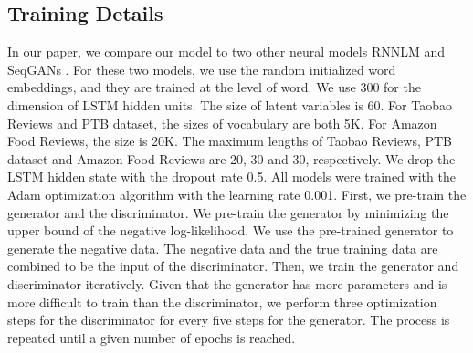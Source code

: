 \documentclass{llncs}
\begin{document}
\subsection{Training Details}
In our paper, we compare our model to two other neural models RNNLM \cite{mikolov2010recurrent} and SeqGANs \cite{yu2016seqgan:}. For these two models, we use the random initialized word embeddings, and they are trained at the level of word. We use 300 for the dimension of LSTM hidden units. The size of latent variables is 60. For Taobao Reviews and PTB dataset, the sizes of vocabulary are both 5K. For Amazon Food Reviews, the size is 20K. The maximum lengths of Taobao Reviews, PTB dataset and Amazon Food Reviews are 20, 30 and 30, respectively. We drop the LSTM hidden state with the dropout rate 0.5. All models were trained with the Adam optimization algorithm \cite{kingma2015adam:} with the learning rate 0.001.
	First, we pre-train the generator and the discriminator. We pre-train the generator by minimizing the upper bound of the negative log-likelihood. We use the pre-trained generator to generate the negative data. The negative data and the true training data are combined to be the input of the discriminator. Then, we train the generator and discriminator iteratively. Given that the generator has more parameters and is more difficult to train than the discriminator, we perform three optimization steps for the discriminator for every five steps for the generator. The process is repeated until a given number of epochs is reached. 
\end{document}
